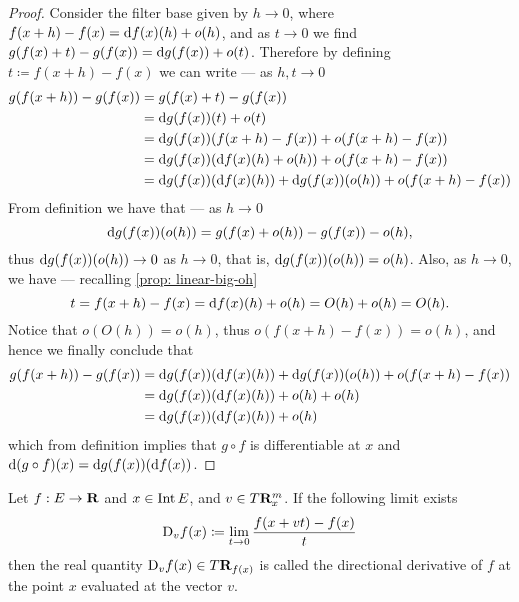 \begin{proof}
    Consider the filter base given by \(h \to 0\), where \(f(x + h) - f(x) = \mathrm{d}
    f(x)(h) + o(h)\), and as \(t \to 0\) we find \(g(f(x) + t) - g(f(x)) = \mathrm{d}
    g(f(x)) + o(t)\). Therefore by defining \(t \coloneq f(x + h) - f(x)\) we can write ---
    as \(h, t \to 0\)
    \begin{align*}
        g(f(x + h)) - g(f(x)) & = g(f(x) + t) - g(f(x))                               \\
                              & = \mathrm{d} g(f(x))(t) + o(t)                             \\
                              & = \mathrm{d} g(f(x))(f(x + h) - f(x)) + o(f(x + h) - f(x))
        \\
                              & = \mathrm{d} g(f(x))(\mathrm{d} f(x)(h) + o(h)) + o(f(x + h) -
        f(x))
        \\
                              & = \mathrm{d} g(f(x))(\mathrm{d} f(x)(h)) + \mathrm{d} g(f(x))(o(h))
        + o(f(x + h) - f(x))
    \end{align*}
    From definition we have that --- as \(h \to 0\)
    \[
        \mathrm{d} g(f(x))(o(h)) = g(f(x) + o(h)) - g(f(x)) - o(h),
    \]
    thus \(\mathrm{d} g(f(x))(o(h)) \to 0\) as \(h \to 0\), that is, \(\mathrm{d} g(f(x))
    (o(h)) = o(h)\). Also, as \(h \to 0\), we have --- recalling \cref{prop:
        linear-big-oh}
    \[
        t = f(x + h) - f(x) = \mathrm{d} f(x)(h) + o(h) = O(h) + o(h) = O(h).
    \]
    Notice that \(o(O(h)) = o(h)\), thus \(o(f(x + h) - f(x)) = o(h)\), and hence
    we finally conclude that
    \begin{align*}
        g(f(x + h)) - g(f(x))
         & = \mathrm{d} g(f(x))(\mathrm{d} f(x)(h)) + \mathrm{d} g(f(x))(o(h)) + o(f(x + h) - f(x)) \\
         & = \mathrm{d} g(f(x))(\mathrm{d} f(x)(h)) + o(h) + o(h)                              \\
         & = \mathrm{d} g(f(x))(\mathrm{d} f(x)(h)) + o(h)
    \end{align*}
    which from definition implies that \(g \circ f\) is differentiable at \(x\)
    and \(\mathrm{d} (g \circ f)(x) = \mathrm{d} g(f(x))(\mathrm{d} f(x))\).
\end{proof}

\begin{definition}\label{def: dir-derivative}
    Let \(f: E \to \mathbf{R}\) and \(x \in  \operatorname{Int} E\), and \(v \in T\mathbf{R}^m_x\). If the
    following limit exists
    \begin{equation}
        \mathrm{D}_v f(x) \coloneq \lim_{t \to 0} \frac{f(x + v t) - f(x)}{t}
    \end{equation}
    then the real quantity \(\mathrm{D}_v f(x) \in T\mathbf{R}_{f(x)}\) is called the
    directional derivative of \(f\) at the point \(x\) evaluated at the vector
    \(v\).
\end{definition}


